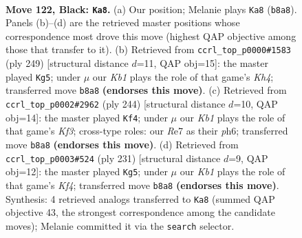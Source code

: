 \documentclass[11pt]{article}
\begin{document}
\clearpage

\begin{figure}[p]\centering
\begin{subfigure}{0.46\textwidth}\centering
\resizebox{\linewidth}{!}{%
\newchessgame
\chessboard[
  setfen={1k6/4r3/2R1p3/4P3/5P1R/8/4K3/8 b - - 30 122},
  showmover=false,
  pgfstyle=straightmove, color=movearrow, markmove={b8-a8}
]}
\caption{}
\end{subfigure}\hfill
\begin{subfigure}{0.46\textwidth}\centering
\resizebox{\linewidth}{!}{%
\newchessgame
\chessboard[
  setfen={8/8/4r3/7k/3R2p1/6P1/3K1P2/8 b - - 52 125},
  showmover=false,
  pgfstyle=straightmove, color=movearrow, markmove={h5-g5}
]}
\caption{}
\end{subfigure}
\\[4pt]
\begin{subfigure}{0.46\textwidth}\centering
\resizebox{\linewidth}{!}{%
\newchessgame
\chessboard[
  setfen={6k1/R4p2/7p/4P2r/P7/5K2/8/8 w - - 0 123},
  showmover=false,
  pgfstyle=straightmove, color=movearrow, markmove={f3-f4}
]}
\caption{}
\end{subfigure}\hfill
\begin{subfigure}{0.46\textwidth}\centering
\resizebox{\linewidth}{!}{%
\newchessgame
\chessboard[
  setfen={7R/8/8/5k2/2r4p/7P/6P1/6K1 b - - 89 116},
  showmover=false,
  pgfstyle=straightmove, color=movearrow, markmove={f5-g5}
]}
\caption{}
\end{subfigure}
\caption{\textbf{Move 122, Black: \texttt{Ka8}.} (a) Our position; Melanie plays \texttt{Ka8} (\texttt{b8a8}). Panels (b)--(d) are the retrieved master positions whose correspondence most drove this move (highest QAP objective among those that transfer to it). (b) Retrieved from \texttt{ccrl\_top\_p0000\#1583} (ply 249) [structural distance $d$=11, QAP obj=15]: the master played \texttt{Kg5}; under $\mu$ our \emph{Kb1} plays the role of that game's \emph{Kh4}; transferred move \texttt{b8a8} \textbf{(endorses this move)}. (c) Retrieved from \texttt{ccrl\_top\_p0002\#2962} (ply 244) [structural distance $d$=10, QAP obj=14]: the master played \texttt{Kf4}; under $\mu$ our \emph{Kb1} plays the role of that game's \emph{Kf3}; cross-type roles: our \emph{R}e7 as their \emph{p}h6; transferred move \texttt{b8a8} \textbf{(endorses this move)}. (d) Retrieved from \texttt{ccrl\_top\_p0003\#524} (ply 231) [structural distance $d$=9, QAP obj=12]: the master played \texttt{Kg5}; under $\mu$ our \emph{Kb1} plays the role of that game's \emph{Kf4}; transferred move \texttt{b8a8} \textbf{(endorses this move)}. Synthesis: 4 retrieved analogs transferred to \texttt{Ka8} (summed QAP objective 43, the strongest correspondence among the candidate moves); Melanie committed it via the \texttt{search} selector.}
\label{fig:thought-m243}
\end{figure}
\end{document}
